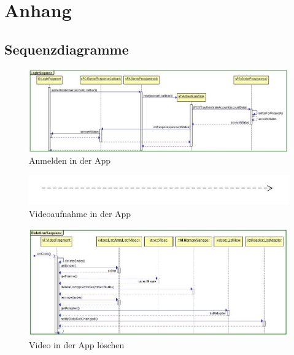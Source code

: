\chapter{Anhang}

\section{Sequenzdiagramme}

\begin{figure}[ht]
	\centering
\includegraphics[width=1\textwidth]{./resources/Diagramme/App/logInSequence.jpg}
\caption{Anmelden in der App}
	\label{fig:AppAuth}
\end{figure}

\begin{figure}[ht]
	\centering
\includegraphics[width=1\textwidth]{./resources/Diagramme/App/recordSequence.jpg}
\caption{Videoaufnahme in der App}
	\label{fig:AppVideo}
\end{figure}

\begin{figure}[ht]
	\centering
\includegraphics[width=1\textwidth]{./resources/Diagramme/App/deleteVideoSequence.jpg}
\caption{Video in der App löschen}
	\label{fig:AppDel}
\end{figure}


